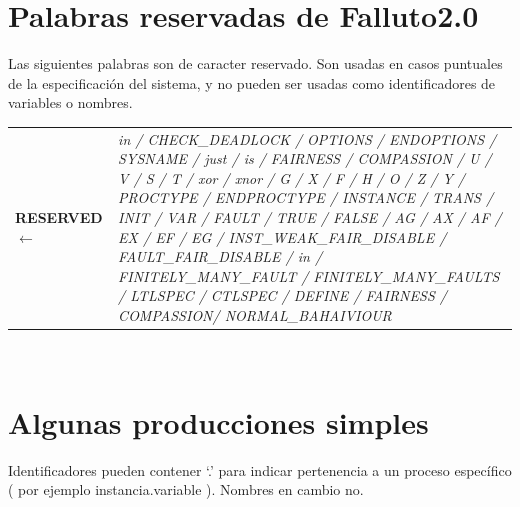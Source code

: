 \documentclass[pdftex,a4paper,12pt]{book}
\begin{document}
\section*{Palabras reservadas de Falluto2.0}

Las siguientes palabras son de caracter reservado. Son usadas en casos puntuales de la especificaci\'on del sistema, y no pueden ser usadas como identificadores de variables o nombres.\\

\begin{tabularx}{\textwidth}{>{\bfseries}l>{\itshape}X }

RESERVED $\longleftarrow$ & in / CHECK\_DEADLOCK / OPTIONS / ENDOPTIONS / SYSNAME / just / is / FAIRNESS / COMPASSION / U / V / S / T / xor / xnor / G / X / F / H / O / Z / Y / PROCTYPE / ENDPROCTYPE / INSTANCE / TRANS / INIT / VAR / FAULT / TRUE / FALSE / AG / AX / AF / EX / EF / EG / INST\_WEAK\_FAIR\_DISABLE / FAULT\_FAIR\_DISABLE / in / FINITELY\_MANY\_FAULT / FINITELY\_MANY\_FAULTS / LTLSPEC / CTLSPEC / DEFINE / FAIRNESS / COMPASSION/ NORMAL\_BAHAIVIOUR\\
\end{tabularx}
~\\
%


\section*{Algunas producciones simples}

Identificadores pueden contener `.' para indicar pertenencia a un proceso espec\'ifico ( por ejemplo instancia.variable ). Nombres en cambio no.\\
\end{document}
